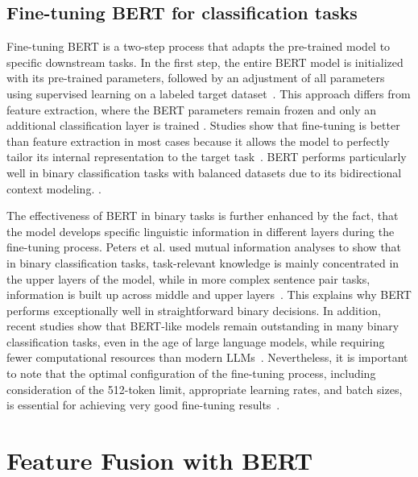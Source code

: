 \subsection{Fine-tuning BERT for classification tasks}
Fine-tuning BERT is a two-step process that adapts the pre-trained model to specific downstream tasks. In the first step, the entire BERT model is initialized with its pre-trained parameters, followed by an adjustment of all parameters using supervised learning on a labeled target dataset~\parencite{devlin2019bert, sun2020finetuneberttextclassification}. This approach differs from feature extraction, where the BERT parameters remain frozen and only an additional classification layer is trained \cite{peters-fintune}. Studies show that fine-tuning is better than feature extraction in most cases because it allows the model to perfectly tailor its internal representation to the target task~\parencite{peters-fintune, sun2020finetuneberttextclassification}.
BERT performs particularly well in binary classification tasks with balanced datasets due to its bidirectional context modeling. \parencite{bilal2022effectiveness}. 

The effectiveness of BERT in binary tasks is further enhanced by the fact, that the model develops specific linguistic information in different layers during the fine-tuning process. Peters et al. \cite{peters-fintune} used mutual information analyses to show that in binary classification tasks, task-relevant knowledge is mainly concentrated in the upper layers of the model, while in more complex sentence pair tasks, information is built up across middle and upper layers~\parencite{peters-fintune}. This explains why BERT performs exceptionally well in straightforward binary decisions.
In addition, recent studies show that BERT-like models remain outstanding in many binary classification tasks, even in the age of large language models, while requiring fewer computational resources than modern LLMs~\parencite{zhang2025bert}. Nevertheless, it is important to note that the optimal configuration of the fine-tuning process, including consideration of the 512-token limit, appropriate learning rates, and batch sizes, is essential for achieving very good fine-tuning results~\parencite{sun2020finetuneberttextclassification, bilal2022effectiveness}.

\section{Feature Fusion with BERT}

